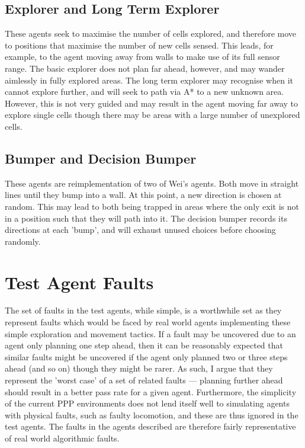 \documentclass[authoryearcitations]{UoYCSproject}
\begin{document}
\subsection{Explorer and Long Term Explorer}
\label{sec:da_5_4}
These agents seek to maximise the number of cells explored, and therefore move to positions that maximise the number of new cells sensed. This leads, for example, to the agent moving away from walls to make use of its full sensor range. The basic explorer does not plan far ahead, however, and may wander aimlessly in fully explored areas. The long term explorer may recognise when it cannot explore further, and will seek to path via A* to a new unknown area. However, this is not very guided and may result in the agent moving far away to explore single cells though there may be areas with a large number of unexplored cells.

\subsection{Bumper and Decision Bumper}
\label{sec:da_5_5}
These agents are reimplementation of two of Wei's agents. Both move in straight lines until they bump into a wall. At this point, a new direction is chosen at random. This may lead to both being trapped in areas where the only exit is not in a position such that they will path into it. The decision bumper records its directions at each 'bump', and will exhaust unused choices before choosing randomly.

\section{Test Agent Faults}
\label{sec:da_6}
The set of faults in the test agents, while simple, is a worthwhile set as they represent faults which would be faced by real world agents implementing these simple exploration and movement tactics. If a fault may be uncovered due to an agent only planning one step ahead, then it can be reasonably expected that similar faults might be uncovered if the agent only planned two or three steps ahead (and so on) though they might be rarer. As such, I argue that they represent the 'worst case' of a set of related faults --- planning further ahead should result in a better pass rate for a given agent. Furthermore, the simplicity of the current PPP environments does not lend itself well to simulating agents with physical faults, such as faulty locomotion, and these are thus ignored in the test agents. The faults in the agents described are therefore fairly representative of real world algorithmic faults.
\end{document}

